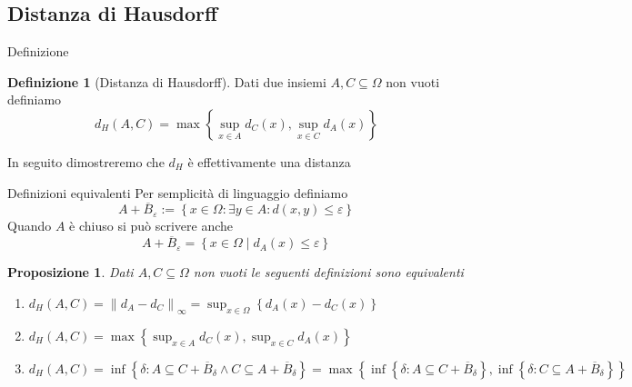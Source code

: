 \documentclass{beamer}
\newcounter{counter1}
\theoremstyle{plain}
\newtheorem{mypro}[counter1]{Proposizione}
\theoremstyle{definition}
\newtheorem{mydef}[counter1]{Definizione}
\theoremstyle{remark}
\newcommand{\obar}[1]{\overline{#1}}
\newcommand{\set}[1]{\left\{#1\right\}}
\newcommand{\norm}[1]{\left\|#1\right\|}
\begin{document}
\subsection{Distanza di Hausdorff}

\begin{frame}{Definizione}
  \begin{mydef}[Distanza di Hausdorff]
    Dati due insiemi $A,C \subseteq \Omega$ non vuoti definiamo
    \[ d_H(A,C) = \max \set{\sup _{x\in A} d_C (x) , \sup _{x\in C}
      d_A (x) } \]
\end{mydef}

In seguito dimostreremo che $d_H$ è effettivamente una distanza
\end{frame}

\begin{frame}{Definizioni equivalenti}
  Per semplicità di linguaggio definiamo%
  \[ A + \obar B_\varepsilon := \set{ x \in \Omega : \exists y \in A :
    d(x,y) \le \varepsilon } \]
  Quando $A$ è chiuso si può scrivere anche
  \[ A + \obar B _{\varepsilon} = \set{ x \in \Omega \mid d_A(x) \le
    \varepsilon} \] 
  \begin{mypro}
    Dati $A, C \subseteq \Omega$ non vuoti le seguenti definizioni
    sono equivalenti
    \begin{enumerate}
    \item $ d_H (A,C) = \norm{ d_A - d_C } _\infty = \sup _{x\in \Omega}
      \set {d_A(x) - d_C(x)}$
    \item $d_H(A,C) = \max \set{\sup _{x\in A} d_C (x) , \sup _{x\in C}
        d_A (x) }$
    \item $d_H (A,C) = \inf \set{\delta : A \subseteq C + \obar B
        _\delta \wedge C \subseteq A + \obar B_\delta} = \max
      \set{\inf \set{\delta : A \subseteq C + \obar B _\delta }, \inf
        \set{\delta : C \subseteq A + \obar B _\delta }} $
    \end{enumerate}
  \end{mypro}
\end{frame}
\end{document}

